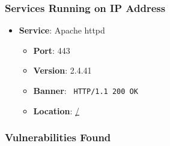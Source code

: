 \documentclass{article}
\begin{document}
\subsubsection*{Services Running on IP Address}

\begin{itemize}
    
        \item \textbf{Service}: Apache httpd
        \begin{itemize}
            \item \textbf{Port}: 443
            \item \textbf{Version}:  2.4.41 
            \item \textbf{Banner}: \texttt{ HTTP/1.1 200 OK
 }
            \item \textbf{Location}: \href{ / }{ / }
        \end{itemize}
    
\end{itemize}


\subsubsection*{Vulnerabilities Found}
\end{document}
